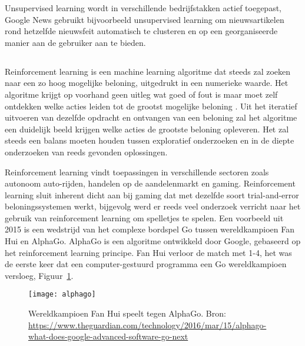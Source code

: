 Unsupervised learning wordt in verschillende bedrijfstakken actief toegepast, Google News gebruikt bijvoorbeeld unsupervised learning om nieuwsartikelen rond hetzelfde nieuwsfeit automatisch te clusteren en op een georganiseerde manier aan de gebruiker aan te bieden.

\subsection{}
\label{sec:reinforcement-learning}
Reinforcement learning is een machine learning algoritme dat steeds zal zoeken naar een zo hoog mogelijke beloning, uitgedrukt in een numerieke waarde. Het algoritme krijgt op voorhand geen uitleg wat goed of fout is maar moet zelf ontdekken welke acties leiden tot de grootst mogelijke beloning \autocite{Sutton2018}. Uit het iteratief uitvoeren van dezelfde opdracht en ontvangen van een beloning zal het algoritme een duidelijk beeld krijgen welke acties de grootste beloning opleveren. Het zal steeds een balans moeten houden tussen exploratief onderzoeken en in de diepte onderzoeken van reeds gevonden oplossingen. 

Reinforcement learning vindt toepassingen in verschillende sectoren zoals autonoom auto-rijden, handelen op de aandelenmarkt en gaming. Reinforcement learning sluit inherent dicht aan bij gaming dat met dezelfde soort trial-and-error beloningssystemen werkt, bijgevolg werd er reeds veel onderzoek verricht naar het gebruik van reinforcement learning om spelletjes te spelen. Een voorbeeld uit 2015 is een wedstrijd van het complexe bordspel Go tussen wereldkampioen Fan Hui en AlphaGo. AlphaGo is een algoritme ontwikkeld door Google, gebaseerd op het reinforcement learning principe. Fan Hui verloor de match met 1-4, het was de eerste keer dat een computer-gestuurd programma een Go wereldkampioen versloeg, Figuur~\ref{fig:alphago}.

\begin{figure}
    \centering
    \texttt{[image: alphago]}
    \caption{Wereldkampioen Fan Hui speelt tegen AlphaGo. Bron: \url{https://www.theguardian.com/technology/2016/mar/15/alphago-what-does-google-advanced-software-go-next}}
    \label{fig:alphago}
\end{figure}

